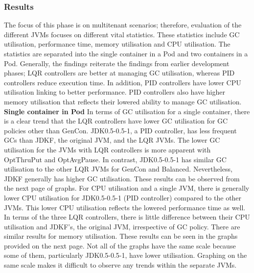 \subsubsection{Results}
The focus of this phase is on multitenant scenarios; therefore,
evaluation of the different JVMs focuses on different vital statistics.
These statistics include GC utilisation, performance time, memory
utilisation and CPU utilisation. The statistics are separated into the
single container in a Pod and two containers in a Pod. Generally, the
findings reiterate the findings from earlier development phases; LQR
controllers are better at managing GC utilisation, whereas PID
controllers reduce execution time. In addition, PID controllers have
lower CPU utilisation linking to better performance. PID
controllers also have higher memory utilisation that reflects their
lowered ability to manage GC utilisation.
\newline\newline
\textbf{Single container in Pod}
\newline\newline
In terms of GC utilisation for a single container, there is a clear
trend that the LQR controllers have lower GC utilisation for GC policies
other than GenCon. JDK0.5-0.5-1, a PID controller, has less frequent GCs
than JDKF, the original JVM, and the LQR JVMs. The lower GC utilisation
for the JVMs with LQR controllers is more apparent with OptThruPut and
OptAvgPause. In contrast, JDK0.5-0.5-1 has similar GC utilisation to the
other LQR JVMs for GenCon and Balanced. Nevertheless, JDKF generally has
higher GC utilisation. These results can be observed from the next page of
graphs.
For CPU utilisation and a single JVM, there is generally lower CPU
utilisation for JDK0.5-0.5-1 (PID controller) compared to the other JVMs. This lower CPU utilisation reflects the
lowered performance time as well. In terms of the three LQR controllers,
there is little difference between their CPU utilisation and JDKF's, the
original JVM, irrespective of GC policy. There are similar results for
memory utilisation. These results can be seen in the graphs provided on
the next page. Not all of the graphs have the same scale because some of
them, particularly JDK0.5-0.5-1, have lower utilisation. Graphing on the
same scale makes it difficult to observe any trends within the separate
JVMs.

